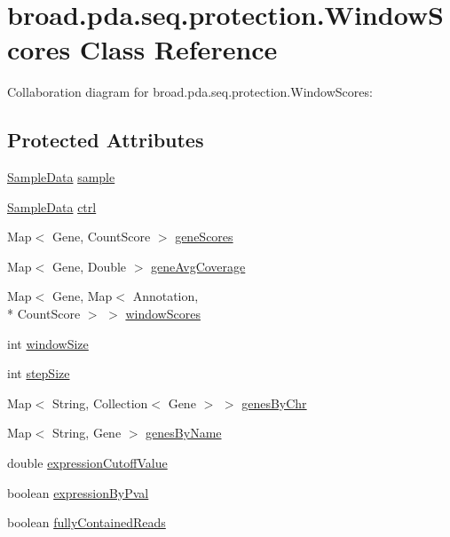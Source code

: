 \hypertarget{classbroad_1_1pda_1_1seq_1_1protection_1_1_window_scores}{\section{broad.\+pda.\+seq.\+protection.\+Window\+Scores Class Reference}
\label{classbroad_1_1pda_1_1seq_1_1protection_1_1_window_scores}
}


Collaboration diagram for broad.\+pda.\+seq.\+protection.\+Window\+Scores\+:
\subsection*{Protected Attributes}
\begin{DoxyCompactItemize}
\item 
\hyperlink{classbroad_1_1pda_1_1seq_1_1protection_1_1_sample_data}{Sample\+Data} \hyperlink{classbroad_1_1pda_1_1seq_1_1protection_1_1_window_scores_a10f405eec7644a33de7c07bb0c8e4caa}{sample}
\item 
\hyperlink{classbroad_1_1pda_1_1seq_1_1protection_1_1_sample_data}{Sample\+Data} \hyperlink{classbroad_1_1pda_1_1seq_1_1protection_1_1_window_scores_adbea63ef3f80374592309593aff3eeac}{ctrl}
\item 
Map$<$ Gene, Count\+Score $>$ \hyperlink{classbroad_1_1pda_1_1seq_1_1protection_1_1_window_scores_a6692ac429e881e1420d05811d1b3f04e}{gene\+Scores}
\item 
Map$<$ Gene, Double $>$ \hyperlink{classbroad_1_1pda_1_1seq_1_1protection_1_1_window_scores_a0e6068b9b298dfc039ca118061817e0b}{gene\+Avg\+Coverage}
\item 
Map$<$ Gene, Map$<$ Annotation, \\*
Count\+Score $>$ $>$ \hyperlink{classbroad_1_1pda_1_1seq_1_1protection_1_1_window_scores_ae7ddb2ee427f84272fd8cf7909fcdf09}{window\+Scores}
\item 
int \hyperlink{classbroad_1_1pda_1_1seq_1_1protection_1_1_window_scores_aa32278d86f1cf46f29e61c13c41375bc}{window\+Size}
\item 
int \hyperlink{classbroad_1_1pda_1_1seq_1_1protection_1_1_window_scores_a9801a4f13246cf58d640e22a93b02c4d}{step\+Size}
\item 
Map$<$ String, Collection$<$ Gene $>$ $>$ \hyperlink{classbroad_1_1pda_1_1seq_1_1protection_1_1_window_scores_aa32bcf4ca6a247e092ca644a0b958237}{genes\+By\+Chr}
\item 
Map$<$ String, Gene $>$ \hyperlink{classbroad_1_1pda_1_1seq_1_1protection_1_1_window_scores_ad1359f7b732916942358a4e3fb15e57c}{genes\+By\+Name}
\item 
double \hyperlink{classbroad_1_1pda_1_1seq_1_1protection_1_1_window_scores_adddc2f2c96c1864ccf74cb15057f21be}{expression\+Cutoff\+Value}
\item 
boolean \hyperlink{classbroad_1_1pda_1_1seq_1_1protection_1_1_window_scores_aa39e5bcacff6e7020237153e53d2002a}{expression\+By\+Pval}
\item 
boolean \hyperlink{classbroad_1_1pda_1_1seq_1_1protection_1_1_window_scores_a36bd088a28a7eeebb5f43064a6ee7f7d}{fully\+Contained\+Reads}
\end{DoxyCompactItemize}
